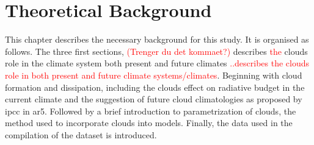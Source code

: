 \setcounter{chapter}{1} 
\chapter{Theoretical Background } \label{ch:theoretical_back}
This chapter describes the necessary background for this study. It is organised as follows. The three first sections, \textcolor{red}{(Trenger du det kommaet?)} describes \textcolor{red}{the} clouds role in the climate system both present and future climates \textcolor{red}{..describes the clouds role in both present and future climate systems/climates}. Beginning with cloud formation and dissipation, including the clouds effect on radiative budget in the current climate and the suggestion of future cloud climatologies as proposed by \acrshort{ipcc} in \acrshort{ar5}. Followed by a brief introduction to parametrization of clouds, the method used to incorporate clouds into models.
Finally, the data used in the compilation of the dataset is introduced. 


%






